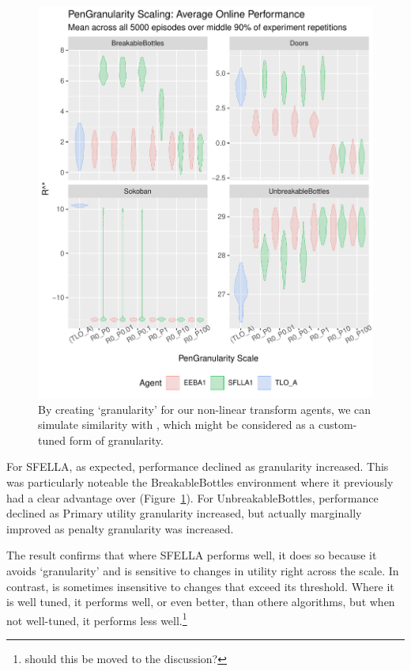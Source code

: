 \begin{figure}
  \includegraphics[width=\columnwidth]{output/multirun_n100_pilot_granularityonline_PenGranularity.pdf}
  \caption{By creating `granularity' for our non-linear transform agents, we can simulate similarity with \tloA{}, which might be considered as a custom-tuned form of granularity.
  }
   \label{fig:exp3_main}
 \end{figure}
 
For SFELLA, as expected, \RStar{} performance declined as granularity increased. This was particularly noteable the BreakableBottles environment where it previously had a clear advantage over \tloA{} (Figure~\ref{fig:exp3_main}). For UnbreakableBottles, performance declined as Primary utility granularity increased, but actually marginally improved as penalty granularity was increased.%

The result confirms that where SFELLA performs well, it does so because it avoids `granularity' and is sensitive to changes in utility right across the scale. In contrast, \tloA{} is sometimes insensitive to changes that exceed its threshold. Where it is well tuned, it performs well, or even better, than othere algorithms, but when not well-tuned, it performs less well.\footnote{should this be moved to the discussion?}





